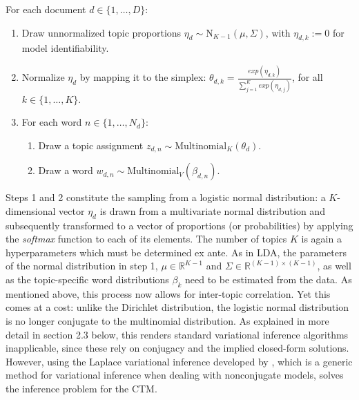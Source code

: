 \vspace{0.25cm}
\noindent
For each document $d \in \{1,\dots,D\}$:

\begin{enumerate}[{1)}]
\vspace{-0.25cm}
\item Draw unnormalized topic proportions $\eta_d \sim \text{N}_{K-1}(\mu, \Sigma)$, with $\eta_{d,k} := 0$ for model identifiability.
\vspace{-0.25cm}
\item Normalize $\eta_d$ by mapping it to the simplex: $\theta_{d,k} = \frac{exp(\eta_{d,k})}{\sum_{j=1}^{K}exp(\eta_{d,j})}$, for all $k \in \{1,\dots,K\}$.
\vspace{-0.25cm}
\item For each word $n \in \{1,\dots,N_d\}$:
	\begin{enumerate}[{a)}]
	\vspace{-0.25cm}    
    \item Draw a topic assignment $z_{d,n} \sim \text{Multinomial}_K(\theta_d)$.
	\vspace{-0.25cm}    
    \item Draw a word $w_{d,n} \sim \text{Multinomial}_V(\beta_{d,n})$.
	\end{enumerate}
\end{enumerate}

\noindent
Steps 1 and 2 constitute the sampling from a logistic normal distribution: a $K$-dimensional vector $\eta_d$ is drawn from a multivariate normal distribution and subsequently transformed to a vector of proportions (or probabilities) by applying the \textit{softmax} function to each of its elements. The number of topics $K$ is again a hyperparameters which must be determined ex ante. As in LDA, the parameters of the normal distribution in step 1, $\mu \in \mathbb{R}^{K-1}$ and $\Sigma \in \mathbb{R}^{(K-1) \times (K-1)}$, as well as the topic-specific word distributions $\beta_k$ need to be estimated from the data. As mentioned above, this process now allows for inter-topic correlation. Yet this comes at a cost: unlike the Dirichlet distribution, the logistic normal distribution is no longer conjugate to the multinomial distribution. As explained in more detail in section 2.3 below, this renders standard variational inference algorithms inapplicable, since these rely on conjugacy and the implied closed-form solutions. However, using the Laplace variational inference developed by \cite{wang2013variational}, which is a generic method for variational inference when dealing with nonconjugate models, solves the inference problem for the CTM.

